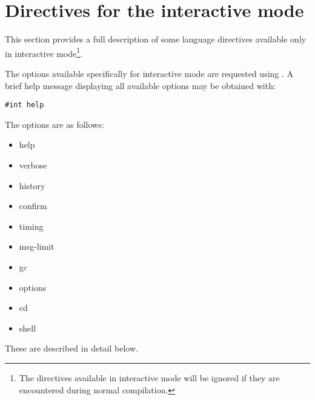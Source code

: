 






\section{Directives for the interactive mode}\label{asugInteractSyscmds}

This section provides a full description of some language directives
available only in interactive mode\footnote{The directives available
in interactive mode will be ignored if they are encountered during
normal compilation.}.

The options available specifically for interactive mode are requested
using .  A brief help message displaying all available
options may be obtained with:

\verb"#int help"

The options are as follows:
\begin{itemize}
\item help
\item verbose
\item history
\item confirm
\item timing
\item msg-limit
\item gc
\item options
\item cd
\item shell
\end{itemize}
These are described in detail below.

